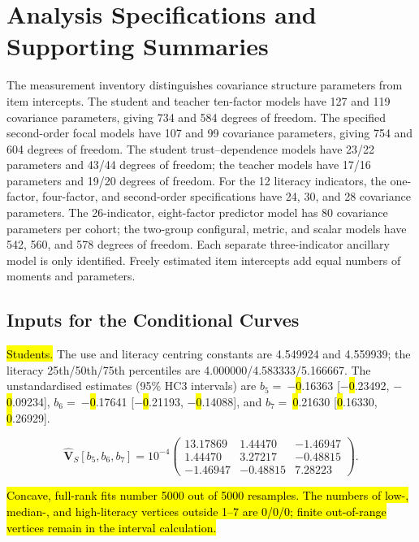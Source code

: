 \documentclass[sustainability,article,accept,moreauthors]{Definitions/mdpi}
\begin{document}
\section{Analysis Specifications and Supporting Summaries}\label{app:analysisrecord}

The measurement inventory distinguishes covariance structure parameters from item intercepts. The student and teacher ten-factor models have 127 and 119 covariance parameters, giving 734 and 584 degrees of freedom. The specified second-order focal models have 107 and 99 covariance parameters, giving 754 and 604 degrees of freedom. The student trust--dependence models have 23/22 parameters and 43/44 degrees of freedom; the teacher models have 17/16 parameters and 19/20 degrees of freedom. For the 12 literacy indicators, the one-factor, four-factor, and second-order specifications have 24, 30, and 28 covariance parameters. The 26-indicator, eight-factor predictor model has 80 covariance parameters per cohort; the two-group configural, metric, and scalar models have 542, 560, and 578 degrees of freedom. Each separate three-indicator ancillary model is only identified. Freely estimated item intercepts add equal numbers of moments and parameters.

\subsection{Inputs for the Conditional Curves}\label{app:curveinputs}

\noindent \hl{Students.} %
 The use and literacy centring constants are 4.549924 and 4.559939; the literacy 25th/50th/75th percentiles are 4.000000/4.583333/5.166667. The unstandardised estimates (95\% HC3 intervals) are $b_5=~$$-$\hl{0}.16363 [$-$\hl{0}.23492, $-$\hl{0}.09234], $b_6=~$$-$\hl{0}.17641 [$-$\hl{0}.21193, $-$\hl{0}.14088], and $b_7=~$\hl{0}.21630 [\hl{0}.16330, \hl{0}.26929].

\begin{equation}\label{eq:covS}
\widehat{\mathbf V}_{S}[b_5,b_6,b_7]=10^{-4}\begin{pmatrix}
13.17869 & 1.44470 & -1.46947\\
1.44470 & 3.27217 & -0.48815\\
-1.46947 & -0.48815 & 7.28223
\end{pmatrix}.
\end{equation}

\hl{Concave, full-rank fits number 5000 out of 5000 resamples. The numbers of low-, median-, and high-literacy vertices outside 1--7 are 0/0/0; finite out-of-range vertices remain in the interval calculation.} %
\end{document}
